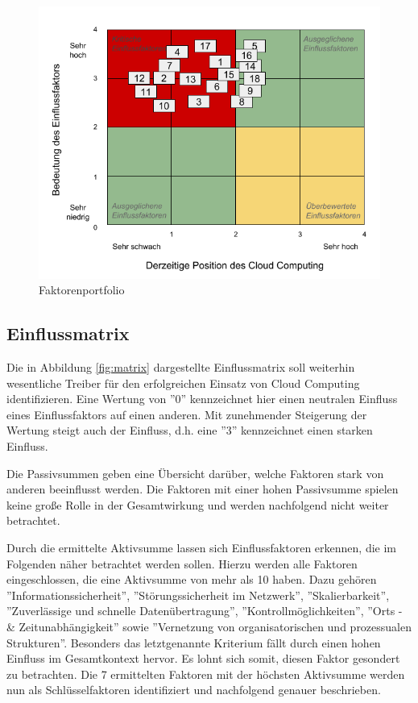 \begin{figure}
	\centering
	\includegraphics[width=\linewidth]{images/portfolio}
	\caption[Caption for parameters]{Faktorenportfolio}
	\label{fig:portfolio}
\end{figure}

\subsection{Einflussmatrix}

Die in Abbildung \ref{fig:matrix} dargestellte Einflussmatrix soll weiterhin wesentliche Treiber für den erfolgreichen Einsatz von Cloud Computing identifizieren. Eine Wertung von ''0'' kennzeichnet hier einen neutralen Einfluss eines Einflussfaktors auf einen anderen. Mit zunehmender Steigerung der Wertung steigt auch der Einfluss, d.h. eine ''3'' kennzeichnet einen starken Einfluss. 

Die Passivsummen geben eine Übersicht darüber, welche Faktoren stark von anderen beeinflusst werden. Die Faktoren mit einer hohen Passivsumme spielen keine große Rolle in der Gesamtwirkung und werden nachfolgend nicht weiter betrachtet.

Durch die ermittelte Aktivsumme lassen sich Einflussfaktoren erkennen, die im Folgenden näher betrachtet werden sollen. Hierzu werden alle Faktoren eingeschlossen, die eine Aktivsumme von mehr als 10 haben. Dazu gehören ''Informationssicherheit'', ''Störungssicherheit im Netzwerk'', ''Skalierbarkeit'', ''Zuverlässige und schnelle Datenübertragung'', ''Kontrollmöglichkeiten'', ''Orts - \& Zeitunabhängigkeit'' sowie ''Vernetzung von organisatorischen und prozessualen Strukturen''. Besonders das letztgenannte Kriterium fällt durch einen hohen Einfluss im Gesamtkontext hervor. Es lohnt sich somit, diesen Faktor gesondert zu betrachten. Die 7 ermittelten Faktoren mit der höchsten Aktivsumme werden nun als Schlüsselfaktoren identifiziert und nachfolgend genauer beschrieben.

